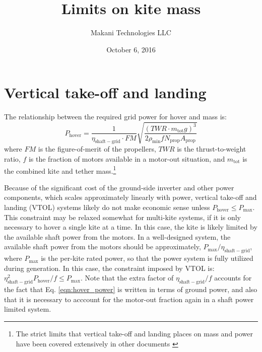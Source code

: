\documentclass[11pt]{amsart}
\title{Limits on kite mass}
\author{Makani Technologies LLC}
\date{October 6, 2016}
\newcommand{\airgrid}{\mathrm{air-grid}}
\newcommand{\eff}{\mathrm{eff}}
\newcommand{\hover}{\mathrm{hover}}
\newcommand{\kite}{\mathrm{kite}}
\newcommand{\mx}{\mathrm{max}}
\newcommand{\mn}{\mathrm{min}}
\newcommand{\prop}{\mathrm{prop}}
\newcommand{\shaftgrid}{\mathrm{shaft-grid}}
\newcommand{\tether}{\mathrm{tether}}
\newcommand{\total}{\mathrm{tot}}
\begin{document}
\maketitle




\section{Vertical take-off and landing}

The relationship between the required grid power for hover and mass
is:
%
\begin{equation}
  \label{eqn:hover_power}
  P_{\hover} = \frac{1}{\eta_{\shaftgrid} \cdot \mathit{FM}}
               \sqrt{\frac{(\mathit{TWR} \cdot m_{\total} g)^3}
                          {2 \rho_{\mn} f N_{\prop} A_{\prop}}}
\end{equation}
%
where $\mathit{FM}$ is the figure-of-merit of the propellers,
$\mathit{TWR}$ is the thrust-to-weight ratio, $f$ is the fraction of
motors available in a motor-out situation, and $m_{\total}$ is the
combined kite and tether mass.\footnote{The strict limits that
  vertical take-off and landing places on mass and power have
  been covered extensively in other documents
  \cite{tvanalsenoy_power_train}}

Because of the significant cost of the ground-side inverter and other
power components, which scales approximately linearly with power,
vertical take-off and landing (VTOL) systems likely do not make
economic sense unless $P_{\hover} \le P_{\mx}$.  This constraint may
be relaxed somewhat for multi-kite systems, if it is only necessary to
hover a single kite at a time.  In this case, the kite is likely
limited by the available shaft power from the motors.  In a
well-designed system, the available shaft power from the motors should
be approximately, $P_{\mx} / \eta_{\shaftgrid}$, where $P_{\mx}$ is
the per-kite rated power, so that the power system is fully utilized
during generation.  In this case, the constraint imposed by VTOL is:
$\eta_{\shaftgrid}^2 P_{\hover} / f \le P_{\mx}$.  Note that the extra
factor of $\eta_{\shaftgrid} / f$ accounts for the fact that
Eq. \ref{eqn:hover_power} is written in terms of ground power, and
also that it is necessary to acccount for the motor-out fraction again
in a shaft power limited system.
\end{document}
